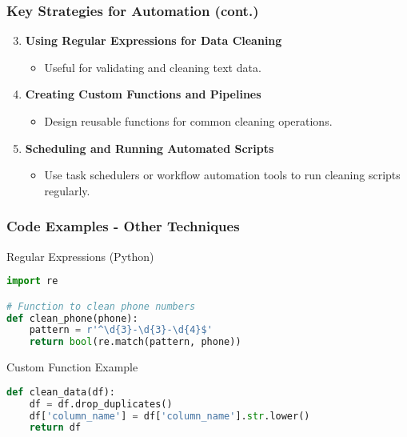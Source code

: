 \documentclass[aspectratio=169]{beamer}
\begin{document}
\begin{frame}[fragile]
    \frametitle{Key Strategies for Automation (cont.)}
    \begin{enumerate}
        \setcounter{enumi}{2} %
        \item \textbf{Using Regular Expressions for Data Cleaning}
        \begin{itemize}
            \item Useful for validating and cleaning text data.
        \end{itemize}
        
        \item \textbf{Creating Custom Functions and Pipelines}
        \begin{itemize}
            \item Design reusable functions for common cleaning operations.
        \end{itemize}
        
        \item \textbf{Scheduling and Running Automated Scripts}
        \begin{itemize}
            \item Use task schedulers or workflow automation tools to run cleaning scripts regularly.
        \end{itemize}
    \end{enumerate}
\end{frame}

\begin{frame}[fragile]
    \frametitle{Code Examples - Other Techniques}
    \begin{block}{Regular Expressions (Python)}
        \begin{lstlisting}[language=Python]
import re

# Function to clean phone numbers
def clean_phone(phone):
    pattern = r'^\d{3}-\d{3}-\d{4}$'
    return bool(re.match(pattern, phone))
        \end{lstlisting}
    \end{block}

    \begin{block}{Custom Function Example}
        \begin{lstlisting}[language=Python]
def clean_data(df):
    df = df.drop_duplicates()
    df['column_name'] = df['column_name'].str.lower()
    return df
        \end{lstlisting}
    \end{block}
\end{frame}
\end{document}
